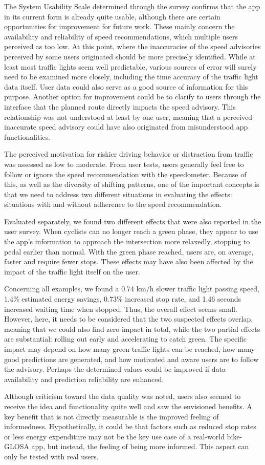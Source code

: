 The System Usability Scale determined through the survey confirms that the app in its current form is already quite usable, although there are certain opportunities for improvement for future work. These mainly concern the availability and reliability of speed recommendations, which multiple users perceived as too low. At this point, where the inaccuracies of the speed advisories perceived by some users originated should be more precisely identified. While at least most traffic lights seem well predictable, various sources of error will surely need to be examined more closely, including the time accuracy of the traffic light data itself. User data could also serve as a good source of information for this purpose. Another option for improvement could be to clarify to users through the interface that the planned route directly impacts the speed advisory. This relationship was not understood at least by one user, meaning that a perceived inaccurate speed advisory could have also originated from misunderstood app functionalities.

The perceived motivation for riskier driving behavior or distraction from traffic was assessed as low to moderate. From user tests, users generally feel free to follow or ignore the speed recommendation with the speedometer. Because of this, as well as the diversity of shifting patterns, one of the important concepts is that we need to address two different situations in evaluating the effects: situations with and without adherence to the speed recommendation. 

Evaluated separately, we found two different effects that were also reported in the user survey. When cyclists can no longer reach a green phase, they appear to use the app's information to approach the intersection more relaxedly, stopping to pedal earlier than normal. With the green phase reached, users are, on average, faster and require fewer stops. These effects may have also been affected by the impact of the traffic light itself on the user. 

Concerning all examples, we found a 0.74 km/h slower traffic light passing speed, 1.4\% estimated energy savings, 0.73\% increased stop rate, and 1.46 seconds increased waiting time when stopped. Thus, the overall effect seems small. However, here, it needs to be considered that the two suspected effects overlap, meaning that we could also find zero impact in total, while the two partial effects are substantial: rolling out early and accelerating to catch green. The specific impact may depend on how many green traffic lights can be reached, how many good predictions are generated, and how motivated and aware users are to follow the advisory. Perhaps the determined values could be improved if data availability and prediction reliability are enhanced. 

Although criticism toward the data quality was noted, users also seemed to receive the idea and functionality quite well and saw the envisioned benefits. A key benefit that is not directly measurable is the improved feeling of informedness. Hypothetically, it could be that factors such as reduced stop rates or less energy expenditure may not be the key use case of a real-world bike-GLOSA app, but instead, the feeling of being more informed. This aspect can only be tested with real users.
